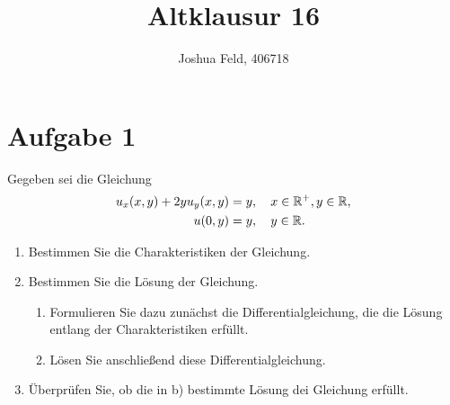 \documentclass{exercise}
\institute{Applied and Computational Mathematics}
\title{Altklausur 16}
\author{Joshua Feld, 406718}
\begin{document}
    \maketitle


    \section*{Aufgabe 1}
    
    \begin{problem}
        Gegeben sei die Gleichung
        \begin{align*}
            u_x\parentheses*{x, y} + 2yu_y\parentheses*{x, y} &= y, \quad x \in \R^+, y \in \R,\\
            u\parentheses*{0, y} &= y, \quad y \in \R.
        \end{align*}
        \begin{enumerate}
            \item Bestimmen Sie die Charakteristiken der Gleichung.
            \item Bestimmen Sie die Lösung der Gleichung.
            \begin{enumerate}
                \item Formulieren Sie dazu zunächst die Differentialgleichung, die die Lösung entlang der Charakteristiken erfüllt.
                \item Lösen Sie anschließend diese Differentialgleichung.
            \end{enumerate}
            \item Überprüfen Sie, ob die in b) bestimmte Lösung dei Gleichung erfüllt.
        \end{enumerate}
    \end{problem}
    
\end{document}
